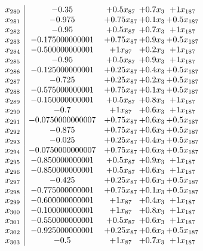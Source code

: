 \documentclass[11pt]{article}
\begin{document}
\[\begin{array}{c| c c@{\hskip 2pt} c@{\hskip 2pt} c@{\hskip 2pt} }
 x_{280}   &  -0.35 & + 0.5 x_{87} & + 0.7 x_{3} & + 1 x_{187}\\
 x_{281}   &  -0.975 & + 0.75 x_{87} & + 0.1 x_{3} & + 0.5 x_{187}\\
 x_{282}   &  -0.95 & + 0.5 x_{87} & + 0.7 x_{3} & + 1 x_{187}\\
 x_{283}   &  -0.175000000001 & + 0.75 x_{87} & + 0.9 x_{3} & + 0.5 x_{187}\\
 x_{284}   &  -0.500000000001 & + 1 x_{87} & + 0.2 x_{3} & + 1 x_{187}\\
 x_{285}   &  -0.95 & + 0.5 x_{87} & + 0.9 x_{3} & + 1 x_{187}\\
 x_{286}   &  -0.125000000001 & + 0.25 x_{87} & + 0.4 x_{3} & + 0.5 x_{187}\\
 x_{287}   &  -0.725 & + 0.25 x_{87} & + 0.2 x_{3} & + 0.5 x_{187}\\
 x_{288}   &  -0.575000000001 & + 0.75 x_{87} & + 0.1 x_{3} & + 0.5 x_{187}\\
 x_{289}   &  -0.150000000001 & + 0.5 x_{87} & + 0.8 x_{3} & + 1 x_{187}\\
 x_{290}   &  -0.7 & + 1 x_{87} & + 0.6 x_{3} & + 1 x_{187}\\
 x_{291}   &  -0.0750000000007 & + 0.75 x_{87} & + 0.6 x_{3} & + 0.5 x_{187}\\
 x_{292}   &  -0.875 & + 0.75 x_{87} & + 0.6 x_{3} & + 0.5 x_{187}\\
 x_{293}   &  -0.025 & + 0.25 x_{87} & + 0.4 x_{3} & + 0.5 x_{187}\\
 x_{294}   &  -0.0750000000007 & + 0.75 x_{87} & + 0.6 x_{3} & + 0.5 x_{187}\\
 x_{295}   &  -0.850000000001 & + 0.5 x_{87} & + 0.9 x_{3} & + 1 x_{187}\\
 x_{296}   &  -0.850000000001 & + 0.5 x_{87} & + 0.6 x_{3} & + 1 x_{187}\\
 x_{297}   &  -0.425 & + 0.25 x_{87} & + 0.6 x_{3} & + 0.5 x_{187}\\
 x_{298}   &  -0.775000000001 & + 0.75 x_{87} & + 0.1 x_{3} & + 0.5 x_{187}\\
 x_{299}   &  -0.600000000001 & + 1 x_{87} & + 0.4 x_{3} & + 1 x_{187}\\
 x_{300}   &  -0.100000000001 & + 1 x_{87} & + 0.8 x_{3} & + 1 x_{187}\\
 x_{301}   &  -0.550000000001 & + 0.5 x_{87} & + 0.6 x_{3} & + 1 x_{187}\\
 x_{302}   &  -0.925000000001 & + 0.25 x_{87} & + 0.6 x_{3} & + 0.5 x_{187}\\
 x_{303}   &  -0.5 & + 1 x_{87} & + 0.7 x_{3} & + 1 x_{187}\\

\end{array}\]
\end{document}
